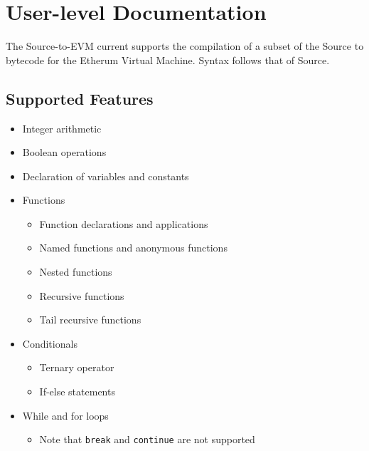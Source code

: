 

\label{Chapter1} %


\newcommand{\keyword}[1]{\textbf{#1}}
\newcommand{\tabhead}[1]{\textbf{#1}}
\newcommand{\code}[1]{\texttt{#1}}
\newcommand{\file}[1]{\texttt{\bfseries#1}}
\newcommand{\option}[1]{\texttt{\itshape#1}}


\section{User-level Documentation}

The Source-to-EVM current supports the compilation of a subset of the Source to bytecode for the Etherum Virtual Machine. Syntax follows that of Source. 

\subsection{Supported Features}
\begin{itemize}
  \item Integer arithmetic
  \item Boolean operations
  \item Declaration of variables and constants
  \item Functions
    \begin{itemize}
      \item Function declarations and applications
      \item Named functions and anonymous functions
      \item Nested functions
      \item Recursive functions
      \item Tail recursive functions
    \end{itemize}
  \item Conditionals
    \begin{itemize}
      \item Ternary operator
      \item If-else statements
    \end{itemize}
  \item While and for loops
    \begin{itemize}
      \item Note that \code{break} and \code{continue} are not supported
    \end{itemize}
\end{itemize}

